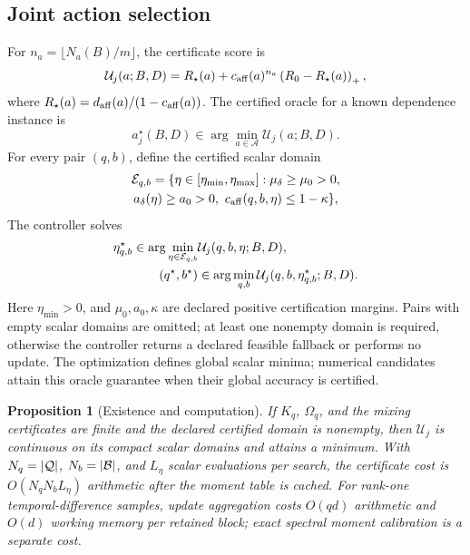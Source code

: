 \documentclass[journal]{IEEEtran}
\newtheorem{proposition}{Proposition}
\newcommand{\A}{\mathcal{A}}
\begin{document}
\subsection{Joint action selection}
For $n_a=\lfloor N_a(B)/m\rfloor$, the certificate score is
\begin{equation}
\mathcal{U}_j(a;B,D)=R_\star(a)+c_{\rm aff}(a)^{n_a}\left(R_0-R_\star(a)\right)_+,
\label{eq:certificate-score}
\end{equation}
where $R_\star(a)=d_{\rm aff}(a)/(1-c_{\rm aff}(a))$.
The certified oracle for a known dependence instance is
\begin{equation}
a_j^\star(B,D)\in\arg\min_{a\in\A}\mathcal{U}_j(a;B,D).
\label{eq:catalogue-oracle}
\end{equation}
For every pair $(q,b)$, define the certified scalar domain
\begin{multline}
{\cal E}_{q,b}=\{\eta\in[\eta_{\min},\eta_{\max}]:
\mu_\delta\ge\mu_0>0,\\
a_\delta(\eta)\ge a_0>0,\ c_{\rm aff}(q,b,\eta)\le1-\kappa\},
\label{eq:certified-step-domain}
\end{multline}
The controller solves
\begin{align}
\eta_{q,b}^\star\in\arg\min_{\eta\in{\cal E}_{q,b}}
&\mathcal U_j(q,b,\eta;B,D),\nonumber\\
(q^\star,b^\star)&\in\arg\min_{q,b}
\mathcal U_j(q,b,\eta_{q,b}^\star;B,D).
\label{eq:mixed-controller}
\end{align}
Here $\eta_{\min}>0$, and $\mu_0,a_0,\kappa$ are declared positive certification margins.
Pairs with empty scalar domains are omitted; at least one nonempty domain is required, otherwise the controller returns a declared feasible fallback or performs no update.
The optimization defines global scalar minima; numerical candidates attain this oracle guarantee when their global accuracy is certified.

\begin{proposition}[Existence and computation]
If $K_q$, $\Omega_q$, and the mixing certificates are finite and the declared certified domain is nonempty, then $\mathcal U_j$ is continuous on its compact scalar domains and attains a minimum.
With $N_q=|{\cal Q}|$, $N_b=|{\cal B}|$, and $L_\eta$ scalar evaluations per search, the certificate cost is $O(N_qN_bL_\eta)$ arithmetic after the moment table is cached.
For rank-one temporal-difference samples, update aggregation costs $O(qd)$ arithmetic and $O(d)$ working memory per retained block; exact spectral moment calibration is a separate cost.
\label{prop:computation}
\end{proposition}
\end{document}
